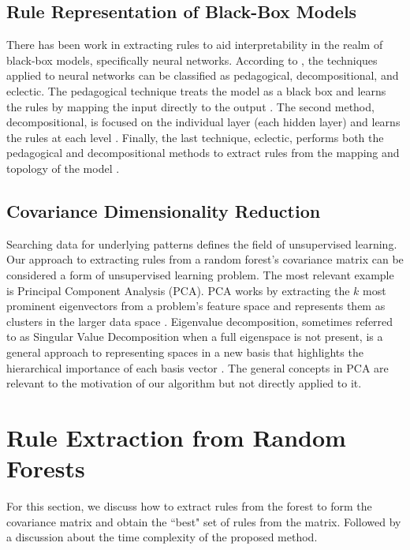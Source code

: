 \documentclass[11pt]{article}
\begin{document}
\subsection{Rule Representation of Black-Box Models}
There has been work in extracting rules to aid interpretability in the realm of black-box models, specifically neural networks. According to \cite{andrews1995survey}, the techniques applied to neural networks can be classified as pedagogical, decompositional, and eclectic. The pedagogical technique treats the model as a black box and learns the rules by mapping the input directly to the output \citep{de2015active, arzamasov2021pedagogical}. The second method, decompositional, is focused on the individual layer (each hidden layer) and learns the rules at each level \citep{fu1994rule, andrews1994rule}. Finally, the last technique, eclectic, performs both the pedagogical and decompositional methods to extract rules from the mapping and topology of the model \citep{hruschka2006extracting}. 
 
\subsection{Covariance Dimensionality Reduction}
Searching data for underlying patterns defines the field of unsupervised learning. Our approach to extracting rules from a random forest's covariance matrix can be considered a form of unsupervised learning problem. The most relevant example is Principal Component Analysis (PCA). PCA works by extracting the $k$ most prominent eigenvectors from a problem's feature space and represents them as clusters in the larger data space \citep{scholkopf1997kernel}. Eigenvalue decomposition, sometimes referred to as Singular Value Decomposition when a full eigenspace is not present, is a general approach to representing spaces in a new basis that highlights the hierarchical importance of each basis vector \citep{strang2006linear, griffiths2018introduction}. The general concepts in PCA are relevant to the motivation of our algorithm but not directly applied to it. 



\section{Rule Extraction from Random Forests}
\label{sec:alg}
For this section, we discuss how to extract rules from the forest to form the covariance matrix and obtain the ``best" set of rules from the matrix. Followed by a discussion about the time complexity of the proposed method.  
\end{document}

